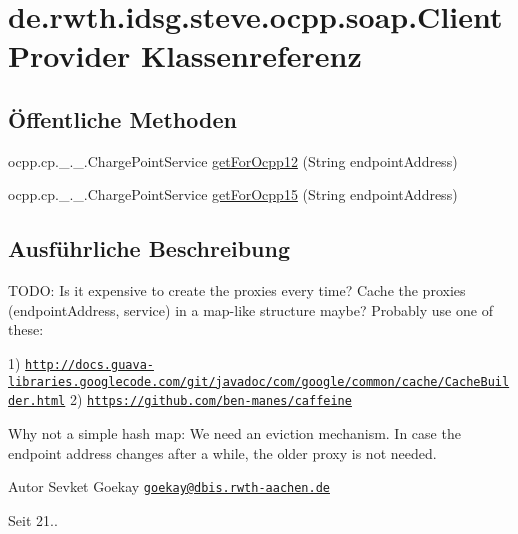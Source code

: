 \hypertarget{classde_1_1rwth_1_1idsg_1_1steve_1_1ocpp_1_1soap_1_1_client_provider}{\section{de.\-rwth.\-idsg.\-steve.\-ocpp.\-soap.\-Client\-Provider Klassenreferenz}
\label{classde_1_1rwth_1_1idsg_1_1steve_1_1ocpp_1_1soap_1_1_client_provider}
}
\subsection*{Öffentliche Methoden}
\begin{DoxyCompactItemize}
\item 
ocpp.\-cp.\-\_.\-\_.\-Charge\-Point\-Service \hyperlink{classde_1_1rwth_1_1idsg_1_1steve_1_1ocpp_1_1soap_1_1_client_provider_a95903bb042da0bb406df12662ee63f0d}{get\-For\-Ocpp12} (String endpoint\-Address)
\item 
ocpp.\-cp.\-\_.\-\_.\-Charge\-Point\-Service \hyperlink{classde_1_1rwth_1_1idsg_1_1steve_1_1ocpp_1_1soap_1_1_client_provider_a52b89de5492c783ede0a062c2f1bdac0}{get\-For\-Ocpp15} (String endpoint\-Address)
\end{DoxyCompactItemize}


\subsection{Ausführliche Beschreibung}
T\-O\-D\-O\-: Is it expensive to create the proxies every time? Cache the proxies (endpoint\-Address, service) in a map-\/like structure maybe? Probably use one of these\-:

1) \href{http://docs.guava-libraries.googlecode.com/git/javadoc/com/google/common/cache/CacheBuilder.html}{\tt http\-://docs.\-guava-\/libraries.\-googlecode.\-com/git/javadoc/com/google/common/cache/\-Cache\-Builder.\-html} 2) \href{https://github.com/ben-manes/caffeine}{\tt https\-://github.\-com/ben-\/manes/caffeine}

Why not a simple hash map\-: We need an eviction mechanism. In case the endpoint address changes after a while, the older proxy is not needed.

\begin{DoxyAuthor}{Autor}
Sevket Goekay \href{mailto:goekay@dbis.rwth-aachen.de}{\tt goekay@dbis.\-rwth-\/aachen.\-de} 
\end{DoxyAuthor}
\begin{DoxySince}{Seit}
21.. 
\end{DoxySince}


